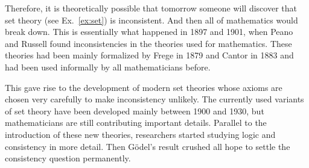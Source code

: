 Therefore, it is theoretically possible that tomorrow someone will discover that set theory (see Ex.~\ref{ex:set}) is inconsistent.
And then all of mathematics would break down.
This is essentially what happened in 1897 and 1901, when Peano and Russell found inconsistencies in the theories used for mathematics.
These theories had been mainly formalized by Frege in 1879 \cite{begriffsschrift} and Cantor in 1883 \cite{grundlagen} and had been used informally by all mathematicians before.

This gave rise to the development of modern set theories whose axioms are chosen very carefully to make inconsistency unlikely.
The currently used variants of set theory have been developed mainly between 1900 and 1930, but mathematicians are still contributing important details.
Parallel to the introduction of these new theories, researchers started studying logic and consistency in more detail.
Then G\"odel's result crushed all hope to settle the consistency question permanently.

